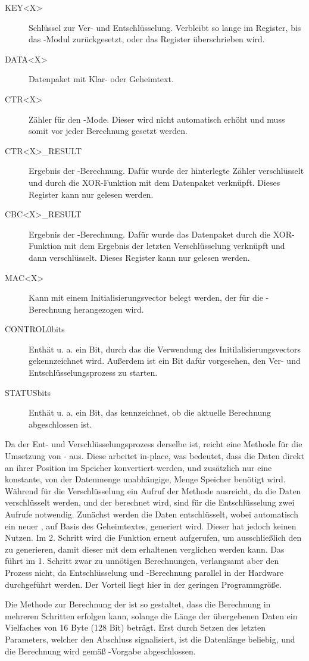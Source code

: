 \begin{description}
  \item[KEY<X>] Schlüssel zur Ver- und Entschlüsselung. Verbleibt so lange im Register, bis das -Modul zurückgesetzt, oder das Register überschrieben wird.
  \item[DATA<X>] Datenpaket mit Klar- oder Geheimtext.
  \item[CTR<X>] Zähler für den -Mode. Dieser wird nicht automatisch erhöht und muss somit vor jeder Berechnung gesetzt werden.
  \item[CTR<X>\_RESULT] Ergebnis der -Berechnung. Dafür wurde der hinterlegte Zähler verschlüsselt und durch die XOR-Funktion mit dem Datenpaket verknüpft. Dieses Register kann nur gelesen werden.
  \item[CBC<X>\_RESULT] Ergebnis der -Berechnung. Dafür wurde das Datenpaket durch die XOR-Funktion mit dem Ergebnis der letzten Verschlüsselung verknüpft und dann verschlüsselt. Dieses Register kann nur gelesen werden.
  \item[MAC<X>] Kann mit einem Initialisierungsvector belegt werden, der für die -Berechnung herangezogen wird.
  \item[CONTROL$0$bits] Enthät u. a. ein Bit, durch das die Verwendung des Initilalisierungsvectors gekennzeichnet wird. Außerdem ist ein Bit dafür vorgesehen, den Ver- und Entschlüsselungsprozess zu starten.
  \item[STATUSbits]  Enthät u. a. ein Bit, das kennzeichnet, ob die aktuelle Berechnung abgeschlossen ist.
\end{description}

Da der Ent- und Verschlüsselungsprozess derselbe ist, reicht eine Methode für die Umsetzung von - aus. Diese arbeitet in-place, was bedeutet,
dass die Daten direkt an ihrer Position im Speicher konvertiert werden, und zusätzlich nur eine konstante, von der Datenmenge unabhängige, Menge Speicher benötigt
wird. Während für die Verschlüsselung ein Aufruf der Methode ausreicht, da die Daten verschlüsselt werden, und der  berechnet wird, sind für die Entschlüsselung
zwei Aufrufe notwendig. Zunächst werden die Daten entschlüsselt, wobei automatisch ein neuer , auf Basis des Geheimtextes, generiert wird. Dieser hat jedoch
keinen Nutzen. Im 2. Schritt wird die Funktion erneut aufgerufen, um ausschließlich den  zu generieren, damit dieser mit dem erhaltenen verglichen werden kann.
Das führt im 1. Schritt zwar zu unnötigen Berechnungen, verlangsamt aber den Prozess nicht, da Entschlüsselung und -Berechnung parallel in der Hardware
durchgeführt werden. Der Vorteil liegt hier in der geringen Programmgröße.

Die Methode zur Berechnung der  ist so gestaltet, dass die Berechnung in mehreren Schritten erfolgen kann, solange die Länge der übergebenen Daten ein
Vielfaches von 16 Byte (128 Bit) beträgt. Erst durch Setzen des letzten Parameters, welcher den Abschluss signalisiert, ist die Datenlänge beliebig, und die
Berechnung wird gemäß -Vorgabe abgeschlossen.